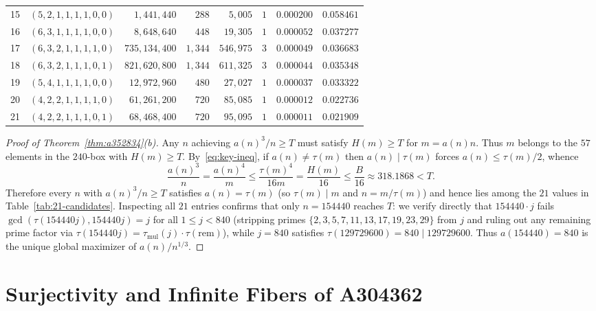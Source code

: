 \documentclass[11pt,a4paper]{article}
\theoremstyle{definition}
\theoremstyle{remark}
\begin{document}
\begin{table}[htbp]
{\begin{tabular}{@{}rlrrrrrr@{}}
15 & $(5,2,1,1,1,1,0,0)$ & $1{,}441{,}440$ & $288$ & $5{,}005$ & $1$ & $0.000200$ & $0.058461$ \\
16 & $(6,3,1,1,1,1,0,0)$ & $8{,}648{,}640$ & $448$ & $19{,}305$ & $1$ & $0.000052$ & $0.037277$ \\
17 & $(6,3,2,1,1,1,1,0)$ & $735{,}134{,}400$ & $1{,}344$ & $546{,}975$ & $3$ & $0.000049$ & $0.036683$ \\
18 & $(6,3,2,1,1,1,0,1)$ & $821{,}620{,}800$ & $1{,}344$ & $611{,}325$ & $3$ & $0.000044$ & $0.035348$ \\
19 & $(5,4,1,1,1,1,0,0)$ & $12{,}972{,}960$ & $480$ & $27{,}027$ & $1$ & $0.000037$ & $0.033322$ \\
20 & $(4,2,2,1,1,1,1,0)$ & $61{,}261{,}200$ & $720$ & $85{,}085$ & $1$ & $0.000012$ & $0.022736$ \\
21 & $(4,2,2,1,1,1,0,1)$ & $68{,}468{,}400$ & $720$ & $95{,}095$ & $1$ & $0.000011$ & $0.021909$ \\
\bottomrule
\end{tabular}
}
\end{table}

\begin{proof}[Proof of Theorem~\ref{thm:a352834}(b)]
Any $n$ achieving $a(n)^3/n \ge T$ must satisfy $H(m) \ge T$ for $m = a(n)n$. Thus $m$ belongs to the $57$ elements in the $240$-box with $H(m) \ge T$. By~\eqref{eq:key-ineq}, if $a(n) \ne \tau(m)$ then $a(n) \mid \tau(m)$ forces $a(n) \le \tau(m)/2$, whence
\[
  \frac{a(n)^3}{n} = \frac{a(n)^4}{m} \le \frac{\tau(m)^4}{16m} = \frac{H(m)}{16} \le \frac{B}{16} \approx 318.1868 < T.
\]
Therefore every $n$ with $a(n)^3/n \ge T$ satisfies $a(n) = \tau(m)$ (so $\tau(m) \mid m$ and $n = m/\tau(m)$) and hence lies among the $21$ values in Table~\ref{tab:21-candidates}. Inspecting all $21$ entries confirms that only $n = 154440$ reaches $T$: we verify directly that $154440 \cdot j$ fails $\gcd(\tau(154440j), 154440j) = j$ for all $1 \le j < 840$ (stripping primes $\{2,3,5,7,11,13,17,19,23,29\}$ from $j$ and ruling out any remaining prime factor via $\tau(154440 j) = \tau_{\text{mul}}(j) \cdot \tau(\text{rem})$), while $j = 840$ satisfies $\tau(129729600) = 840 \mid 129729600$. Thus $a(154440) = 840$ is the unique global maximizer of $a(n)/n^{1/3}$.
\end{proof}

\section{Surjectivity and Infinite Fibers of A304362}
\end{document}
